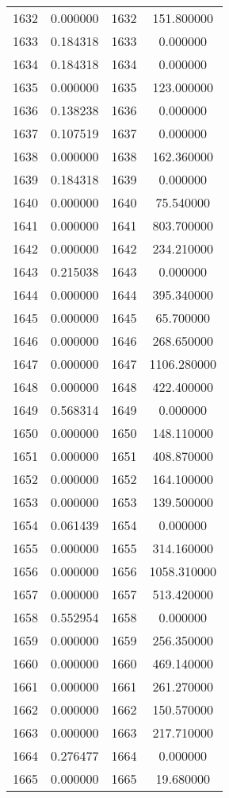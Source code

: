 \documentclass[12pt]{article}
\begin{document}
\begin{longtable}{@{}cccc@{}}
1632 & 0.000000 & 1632 & 151.800000 \\
1633 & 0.184318 & 1633 & 0.000000 \\
1634 & 0.184318 & 1634 & 0.000000 \\
1635 & 0.000000 & 1635 & 123.000000 \\
1636 & 0.138238 & 1636 & 0.000000 \\
1637 & 0.107519 & 1637 & 0.000000 \\
1638 & 0.000000 & 1638 & 162.360000 \\
1639 & 0.184318 & 1639 & 0.000000 \\
1640 & 0.000000 & 1640 & 75.540000 \\
1641 & 0.000000 & 1641 & 803.700000 \\
1642 & 0.000000 & 1642 & 234.210000 \\
1643 & 0.215038 & 1643 & 0.000000 \\
1644 & 0.000000 & 1644 & 395.340000 \\
1645 & 0.000000 & 1645 & 65.700000 \\
1646 & 0.000000 & 1646 & 268.650000 \\
1647 & 0.000000 & 1647 & 1106.280000 \\
1648 & 0.000000 & 1648 & 422.400000 \\
1649 & 0.568314 & 1649 & 0.000000 \\
1650 & 0.000000 & 1650 & 148.110000 \\
1651 & 0.000000 & 1651 & 408.870000 \\
1652 & 0.000000 & 1652 & 164.100000 \\
1653 & 0.000000 & 1653 & 139.500000 \\
1654 & 0.061439 & 1654 & 0.000000 \\
1655 & 0.000000 & 1655 & 314.160000 \\
1656 & 0.000000 & 1656 & 1058.310000 \\
1657 & 0.000000 & 1657 & 513.420000 \\
1658 & 0.552954 & 1658 & 0.000000 \\
1659 & 0.000000 & 1659 & 256.350000 \\
1660 & 0.000000 & 1660 & 469.140000 \\
1661 & 0.000000 & 1661 & 261.270000 \\
1662 & 0.000000 & 1662 & 150.570000 \\
1663 & 0.000000 & 1663 & 217.710000 \\
1664 & 0.276477 & 1664 & 0.000000 \\
1665 & 0.000000 & 1665 & 19.680000 \\

\end{longtable}
\end{document}
